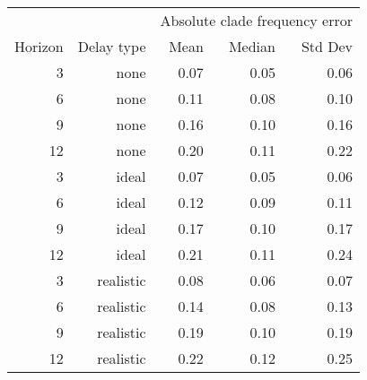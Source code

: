 
\begin{tabular*}{0.7\textwidth}{rrrrr}
\toprule
        &            & \multicolumn{3}{c}{Absolute clade frequency error} \\
Horizon & Delay type & Mean & Median & Std Dev \\
\midrule

3 & none & 0.07 & 0.05 & 0.06 \\
6 & none & 0.11 & 0.08 & 0.10 \\
9 & none & 0.16 & 0.10 & 0.16 \\
12 & none & 0.20 & 0.11 & 0.22 \\
3 & ideal & 0.07 & 0.05 & 0.06 \\
6 & ideal & 0.12 & 0.09 & 0.11 \\
9 & ideal & 0.17 & 0.10 & 0.17 \\
12 & ideal & 0.21 & 0.11 & 0.24 \\
3 & realistic & 0.08 & 0.06 & 0.07 \\
6 & realistic & 0.14 & 0.08 & 0.13 \\
9 & realistic & 0.19 & 0.10 & 0.19 \\
12 & realistic & 0.22 & 0.12 & 0.25 \\

\bottomrule
\end{tabular*}


